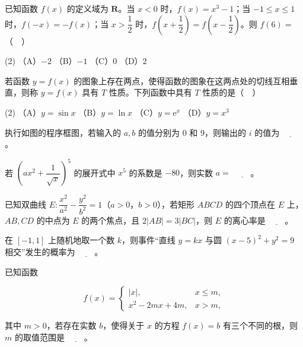 \begin{question}
已知函数 \(f(x)\) 的定义域为 \(\mathbf{R}\)。当 \(x<0\) 时，\(f(x)=x^{3}-1\)；当 \(-1\leqslant x\leqslant 1\) 时，\(f(-x)=-f(x)\)；当 \(x>\dfrac{1}{2}\) 时，\(f\left(x+\dfrac{1}{2}\right)=f\left(x-\dfrac{1}{2}\right)\)。则 \(f(6)=\)（　）

\begin{gkopts}(2)
\task （A）\(-2\)
\task （B）\(-1\)
\task （C）\(0\)
\task （D）\(2\)
\end{gkopts}

\end{question}
\begin{question}
若函数 \(y=f(x)\) 的图象上存在两点，使得函数的图象在这两点处的切线互相垂直，则称 \(y=f(x)\) 具有 \(T\) 性质。下列函数中具有 \(T\) 性质的是（　）

\begin{gkopts}(2)
\task （A）\(y=\sin x\)
\task （B）\(y=\ln x\)
\task （C）\(y=\mathrm{e}^{x}\)
\task （D）\(y=x^{3}\)
\end{gkopts}

\end{question}

\Needspace{0.4\textheight}
\begin{question}
执行如图的程序框图，若输入的 \(a,b\) 的值分别为 \(0\) 和 \(9\)，则输出的 \(i\) 的值为 \(\underline{\qquad}\)。
\nopagebreak[4]
\begin{center}\end{center}
\nopagebreak[4]
\end{question}
\begin{question}
若 \(\left(ax^{2}+\dfrac{1}{\sqrt{x}}\right)^{5}\) 的展开式中 \(x^{5}\) 的系数是 \(-80\)，则实数 \(a=\) \(\underline{\qquad}\)。

\end{question}
\begin{question}
已知双曲线 \(E:\dfrac{x^{2}}{a^{2}}-\dfrac{y^{2}}{b^{2}}=1\)（\(a>0\)，\(b>0\)），若矩形 \(ABCD\) 的四个顶点在 \(E\) 上，\(AB,CD\) 的中点为 \(E\) 的两个焦点，且 \(2|AB|=3|BC|\)，则 \(E\) 的离心率是 \(\underline{\qquad}\)。

\end{question}
\begin{question}
在 \([-1,1]\) 上随机地取一个数 \(k\)，则事件“直线 \(y=kx\) 与圆 \((x-5)^{2}+y^{2}=9\) 相交”发生的概率为 \(\underline{\qquad}\)。

\end{question}
\begin{question}
已知函数

\nopagebreak[4]
\[
f(x)=\begin{cases}|x|, & x\leqslant m,\\x^{2}-2mx+4m, & x>m,\end{cases}
\]

其中 \(m>0\)，若存在实数 \(b\)，使得关于 \(x\) 的方程 \(f(x)=b\) 有三个不同的根，则 \(m\) 的取值范围是 \(\underline{\qquad}\)。

\end{question}

